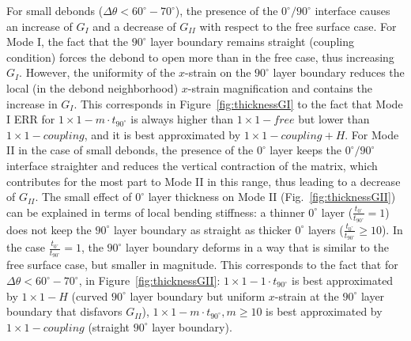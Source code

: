 \documentclass[review]{elsarticle}
\begin{document}
For small debonds ($\Delta\theta<60^{\circ}-70^{\circ}$), the presence of the $0^{\circ}/90^{\circ}$ interface causes an increase of $G_{I}$ and a decrease of $G_{II}$ with respect to the free surface case. For Mode I, the fact that the $90^{\circ}$ layer boundary remains straight (coupling condition) forces the debond to open more than in the free case, thus increasing $G_{I}$. However, the uniformity of the $x$-strain on the $90^{\circ}$ layer boundary reduces the local (in the debond neighborhood) $x$-strain magnification and contains the increase in $G_{I}$. This corresponds in Figure~\ref{fig:thicknessGI} to the fact that Mode I ERR for $1\times1-m\cdot t_{90^{\circ}}$ is always higher than $1\times1-free$ but lower than $1\times1-coupling$, and it is best approximated by $1\times1-coupling+H$. For Mode II in the case of small debonds, the presence of the $0^{\circ}$ layer  keeps the $0^{\circ}/90^{\circ}$ interface straighter and reduces the vertical contraction of the matrix, which contributes for the most part to Mode II in this range, thus leading to a decrease of $G_{II}$. The small effect of $0^{\circ}$ layer thickness on Mode II (Fig.~\ref{fig:thicknessGII}) can be explained in terms of local bending stiffness: a thinner $0^{\circ}$ layer ($\frac{t_{0^{\circ}}}{t_{90^{\circ}}}=1$) does not keep the $90^{\circ}$ layer boundary as straight as thicker $0^{\circ}$ layers ($\frac{t_{0^{\circ}}}{t_{90^{\circ}}}\geq10$). In the case $\frac{t_{0^{\circ}}}{t_{90^{\circ}}}=1$, the $90^{\circ}$ layer boundary deforms in a way that is similar to the free surface case, but smaller in magnitude. This corresponds to the fact that for $\Delta\theta<60^{\circ}-70^{\circ}$, in Figure~\ref{fig:thicknessGII}: $1\times1-1\cdot t_{90^{\circ}}$ is best approximated by $1\times1-H$ (curved $90^{\circ}$ layer boundary but uniform $x$-strain at the $90^{\circ}$ layer boundary that disfavors $G_{II}$), $1\times1-m\cdot t_{90^{\circ}},m\geq10$ is best approximated by $1\times1-coupling$ (straight $90^{\circ}$ layer boundary).\\
\end{document}
